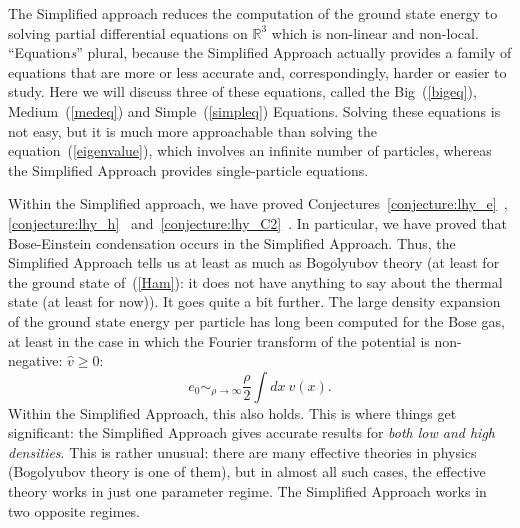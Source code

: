 \documentclass{ian}
\begin{document}
\indent
The Simplified approach reduces the computation of the ground state energy to solving partial differential equations on $\mathbb R^3$ which is non-linear and non-local.
``Equation{\it s}'' plural, because the Simplified Approach actually provides a family of equations that are more or less accurate and, correspondingly, harder or easier to study.
Here we will discuss three of these equations, called the Big\-~(\ref{bigeq}), Medium\-~(\ref{medeq}) and Simple\-~(\ref{simpleq}) Equations.
Solving these equations is not easy, but it is much more approachable than solving the equation\-~(\ref{eigenvalue}), which involves an infinite number of particles, whereas the Simplified Approach provides single-particle equations.
\bigskip

\indent
Within the Simplified approach, we have proved Conjectures\-~\ref{conjecture:lhy_e}\-~\cite{CJL20}, \ref{conjecture:lhy_h}\-~\cite{CJL21} and\-~\ref{conjecture:lhy_C2}\-~\cite{Ja22}.
In particular, we have proved that Bose-Einstein condensation occurs in the Simplified Approach.
Thus, the Simplified Approach tells us at least as much as Bogolyubov theory (at least for the ground state of\-~(\ref{Ham}): it does not have anything to say about the thermal state (at least for now)).
It goes quite a bit further.
The large density expansion of the ground state energy per particle has long been computed for the Bose gas, at least in the case in which the Fourier transform of the potential is non-negative: $\hat v\geqslant 0$:
\begin{equation}
  e_0\sim_{\rho\to\infty}\frac\rho2\int dx\ v(x)
  .
  \label{e_highrho}
\end{equation}
Within the Simplified Approach, this also holds.
This is where things get significant: the Simplified Approach gives accurate results for {\it both low and high densities}.
This is rather unusual: there are many effective theories in physics (Bogolyubov theory is one of them), but in almost all such cases, the effective theory works in just one parameter regime.
The Simplified Approach works in two opposite regimes.
\bigskip
\end{document}
